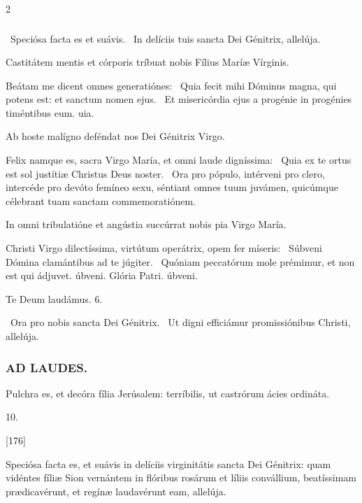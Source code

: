 \documentclass[9pt,twoside]{extarticle}
\begin{document}
\begin{multicols}{2}
\subsubsection*{}
\begin{tightlist}{}
\item {}~Speciósa facta es et suávis. ~In delíciis tuis sancta Dei Génitrix, allelúja.
\item {\small {} Castitátem mentis et córporis tríbuat nobis Fílius Maríæ Vírginis.}
\item {} Beátam me dicent omnes generatiónes: \textred{*}~Quia fecit mihi Dóminus magna, qui potens est: et sanctum nomen ejus.
~Et misericórdia ejus a progénie in progénies timéntibus eum. uia.
\item {\small {} Ab hoste malígno deféndat nos Dei Génitrix Virgo.}
\item {} Felix namque es, sacra Virgo María, et omni laude digníssima: \textred{*}~Quia ex te ortus est sol justítiæ Christus Deus noster.
~Ora pro pópulo, intérveni pro clero, intercéde pro devóto femíneo sexu, séntiant omnes tuum juvámen, quicúmque célebrant tuam sanctam commemoratiónem.
\item {\small {} In omni tribulatióne et angústia succúrrat nobis pia Virgo María.}
\item {} Christi Virgo dilectíssima, virtútum operátrix, opem fer míseris: \textred{*}~Súbveni Dómina clamántibus ad te júgiter.
~Quóniam peccatórum mole prémimur, et non est qui ádjuvet. úbveni. Glória Patri. úbveni.
\end{tightlist}

\begin{tightlist}{}
\item Te Deum laudámus. 6.
\item {}~Ora pro nobis sancta Dei Génitrix. ~Ut digni efficiámur promissiónibus Christi, allelúja.
\end{tightlist}

\subsubsection*{\center \textsc{AD LAUDES.}}
\begin{tightlist}{}
\item {} Pulchra es, et decóra fília Jerúsalem: terríbilis, ut castrórum ácies ordináta.
\item {} 10.
\item {} [176] 
\item {} Speciósa facta es, et suávis in delíciis virginitátis sancta Dei Génitrix: quam vidéntes fíliæ Sion vernántem in flóribus rosárum et líliis convállium, beatíssimam prædicavérunt, et regínæ laudavérunt eam, allelúja.
\end{tightlist}


\end{multicols}
\end{document}
